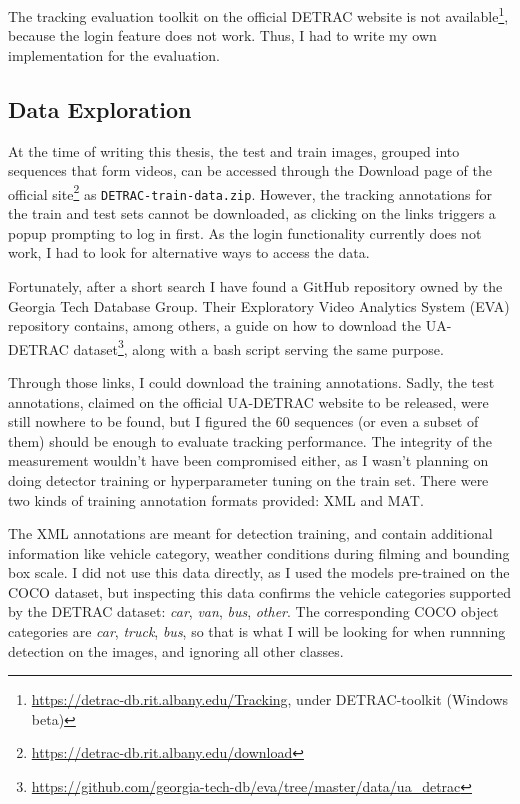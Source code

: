 The tracking evaluation toolkit on the official DETRAC website is not available\footnote{\url{https://detrac-db.rit.albany.edu/Tracking}, under DETRAC-toolkit (Windows beta)}, because the login feature does not work. Thus, I had to write my own implementation for the evaluation. 

\subsection{Data Exploration}

At the time of writing this thesis, the test and train images, grouped into sequences that form videos, can be accessed through the Download page of the official site\footnote{\url{https://detrac-db.rit.albany.edu/download}} as \verb|DETRAC-train-data.zip|. However, the tracking annotations for the train and test sets cannot be downloaded, as clicking on the links triggers a popup prompting to log in first. As the login functionality currently does not work, I had to look for alternative ways to access the data.  

Fortunately, after a short search I have found a GitHub repository owned by the Georgia Tech Database Group. Their Exploratory Video Analytics System (EVA) repository contains, among others, a guide on how to download the UA-DETRAC dataset\footnote{\url{https://github.com/georgia-tech-db/eva/tree/master/data/ua_detrac}}, along with a bash script serving the same purpose.

Through those links, I could download the training annotations. Sadly, the test annotations, claimed on the official UA-DETRAC website to be released, were still nowhere to be found, but I figured the 60 sequences (or even a subset of them) should be enough to evaluate tracking performance. The integrity of the measurement wouldn't have been compromised either, as I wasn't planning on doing detector training or hyperparameter tuning on the train set. There were two kinds of training annotation formats provided: XML and MAT.

The XML annotations are meant for detection training, and contain additional information like vehicle category, weather conditions during filming and bounding box scale. I did not use this data directly, as I used the models pre-trained on the COCO dataset, but inspecting this data confirms the vehicle categories supported by the DETRAC dataset: \textit{car}, \textit{van}, \textit{bus}, \textit{other}. The corresponding COCO object categories are \textit{car}, \textit{truck}, \textit{bus}, so that is what I will be looking for when runnning detection on the images, and ignoring all other classes.

